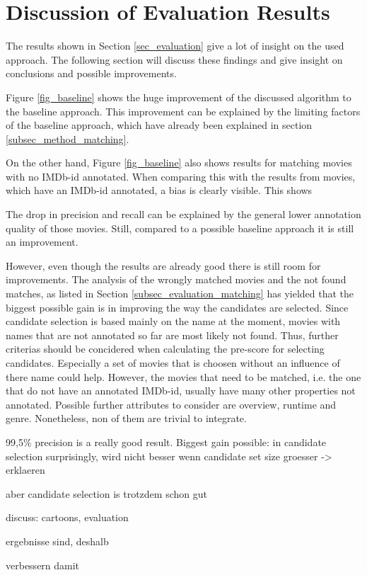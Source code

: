 \section{Discussion of Evaluation Results}
\label{sec_discussion}

The results shown in Section \ref{sec_evaluation} give a lot of insight on the used approach.
The following section will discuss these findings and give insight on conclusions and possible improvements.

Figure \ref{fig_baseline} shows the huge improvement of the discussed algorithm to the baseline approach.
This improvement can be explained by the limiting factors of the baseline approach, which have already been explained in section \ref{subsec_method_matching}.

On the other hand, Figure \ref{fig_baseline} also shows results for matching movies with no IMDb-id annotated.
When comparing this with the results from movies, which have an IMDb-id annotated, a bias is clearly visible.
This shows



The drop in precision and recall can be explained by the general lower annotation quality of those movies.
Still, compared to a possible baseline approach it is still an improvement.

However, even though the results are already good there is still room for improvements.
The analysis of the wrongly matched movies and the not found matches, as listed in Section \ref{subsec_evaluation_matching} has yielded that the biggest possible gain is in improving the way the candidates are selected.
Since candidate selection is based mainly on the name at the moment, movies with names that are not annotated so far are most likely not found.
Thus, further criterias should be concidered when calculating the pre-score for selecting candidates.
Especially a set of movies that is choosen without an influence of there name could help.
However, the movies that need to be matched, i.e. the one that do not have an annotated IMDb-id, usually have many other properties not annotated.
Possible further attributes to consider are overview, runtime and genre.
Nonetheless, non of them are trivial to integrate.

99,5\% precision is a really good result.
Biggest gain possible: in candidate selection
surprisingly, wird nicht besser wenn candidate set size groesser -> erklaeren

aber candidate selection is trotzdem schon gut

discuss: cartoons, evaluation

ergebnisse sind, deshalb

verbessern damit

